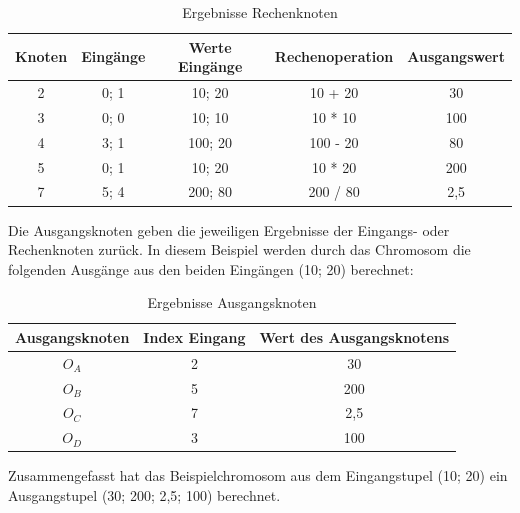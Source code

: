 \begin{table}[h]
    \centering
    \begin{tabular}{c|c|c|c|c}
       \textbf{Knoten} & \textbf{Eingänge} & \textbf{Werte Eingänge} & \textbf{Rechenoperation} & \textbf{Ausgangswert} \\ \hline
        2 & 0; 1 & 10; 20 & 10 + 20 & 30 \\ \hline
        3 & 0; 0 & 10; 10 & 10 * 10 & 100 \\ \hline
        4 & 3; 1 & 100; 20 & 100 - 20 & 80 \\ \hline
        5 & 0; 1 & 10; 20 & 10 * 20 & 200 \\ \hline
        7 & 5; 4 & 200; 80 & 200 / 80 & 2,5
    \end{tabular}
    \caption{Ergebnisse Rechenknoten}
    \label{table:ergebnisseRechenknoten}
\end{table}

Die Ausgangsknoten geben die jeweiligen Ergebnisse der Eingangs- oder Rechenknoten zurück.
In diesem Beispiel werden durch das Chromosom die folgenden Ausgänge aus den beiden Eingängen (10; 20) berechnet:

\begin{table}[h]
    \centering
    \begin{tabular}{c|c|c}
       \textbf{Ausgangsknoten} & \textbf{Index Eingang} & \textbf{Wert des Ausgangsknotens} \\ \hline
        $O_A$ & 2 & 30 \\ \hline
        $O_B$ & 5 & 200 \\ \hline
        $O_C$ & 7 & 2,5 \\ \hline
        $O_D$ & 3 & 100
    \end{tabular}
    \caption{Ergebnisse Ausgangsknoten}
    \label{table:ergebnisseAusgangsknoten}
\end{table}

Zusammengefasst hat das Beispielchromosom aus dem Eingangstupel (10; 20) ein Ausgangstupel (30; 200; 2,5; 100) berechnet.\\

